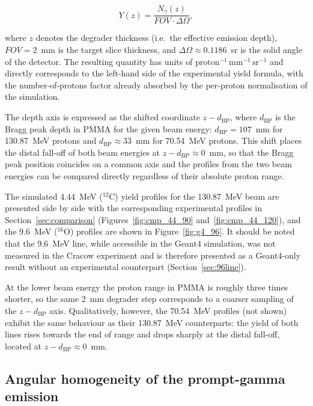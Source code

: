 \documentclass[a4paper]{article}
\begin{document}
\begin{equation}
    Y(z) = \frac{N_\gamma(z)}{FOV \cdot \Delta\Omega},
    \label{eq:yield}
\end{equation}

where $z$ denotes the degrader thickness (i.e.\ the effective emission depth), $FOV = 2$~mm is the target slice thickness, and $\Delta\Omega \approx 0.1186$~sr is the solid angle of the detector. The resulting quantity has units of $\mathrm{proton^{-1}\,mm^{-1}\,sr^{-1}}$ and directly corresponds to the left-hand side of the experimental yield formula, with the number-of-protons factor already absorbed by the per-proton normalisation of the simulation.

The depth axis is expressed as the shifted coordinate $z - d_\mathrm{BP}$, where $d_\mathrm{BP}$ is the Bragg peak depth in PMMA for the given beam energy: $d_\mathrm{BP} = 107$~mm for 130.87~MeV protons and $d_\mathrm{BP} \approx 33$~mm for 70.54~MeV protons. This shift places the distal fall-off of both beam energies at $z - d_\mathrm{BP} \approx 0$~mm, so that the Bragg peak position coincides on a common axis and the profiles from the two beam energies can be compared directly regardless of their absolute proton range.

The simulated 4.44~MeV ($^{12}$C) yield profiles for the 130.87~MeV beam are presented side by side with the corresponding experimental profiles in Section~\ref{sec:comparison} (Figures~\ref{fig:cmp_44_90} and~\ref{fig:cmp_44_120}), and the 9.6~MeV ($^{16}$O) profiles are shown in Figure~\ref{fig:g4_96}. It should be noted that the 9.6~MeV line, while accessible in the Geant4 simulation, was not measured in the Cracow experiment and is therefore presented as a Geant4-only result without an experimental counterpart (Section~\ref{sec:96line}).

At the lower beam energy the proton range in PMMA is roughly three times shorter, so the same 2~mm degrader step corresponds to a coarser sampling of the $z - d_\mathrm{BP}$ axis. Qualitatively, however, the 70.54~MeV profiles (not shown) exhibit the same behaviour as their 130.87~MeV counterparts: the yield of both lines rises towards the end of range and drops sharply at the distal fall-off, located at $z - d_\mathrm{BP} \approx 0$~mm.

\subsection{Angular homogeneity of the prompt-gamma emission}
\label{sec:homogeneity}
\end{document}
